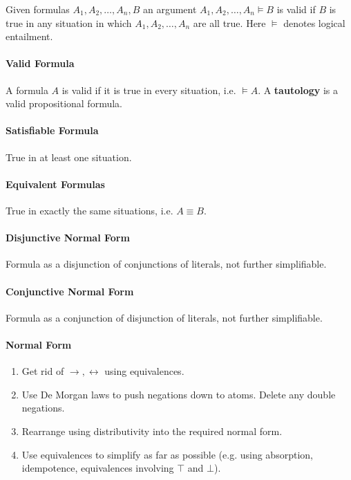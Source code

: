 \documentclass[10pt,twoside,twocolumn]{article}
\begin{document}
Given formulas $A_{1},A_{2},\dots,A_{n},B$ an argument $A_{1},A_{2},\dots,A_{n}\vDash B$
is valid if $B$ is true in any situation in which $A_{1},A_{2},\dots,A_{n}$
are all true. Here $\vDash$ denotes logical entailment.


\paragraph{Valid Formula}

A formula $A$ is valid if it is true in every situation, i.e. $\vDash A$.
A \textbf{tautology} is a valid propositional formula.


\paragraph{Satisfiable Formula}

True in at least one situation.


\paragraph{Equivalent Formulas}

True in exactly the same situations, i.e. $A\equiv B$.


\paragraph{Disjunctive Normal Form}

Formula as a disjunction of conjunctions of literals, not further
simplifiable.


\paragraph{Conjunctive Normal Form}

Formula as a conjunction of disjunction of literals, not further simplifiable.


\paragraph{Normal Form}
\begin{enumerate}
\item Get rid of $\rightarrow,\leftrightarrow$ using equivalences.
\item Use De Morgan laws to push negations down to atoms. Delete any double
negations.
\item Rearrange using distributivity into the required normal form.
\item Use equivalences to simplify as far as possible (e.g. using absorption,
idempotence, equivalences involving $\top$ and $\bot$).
\end{enumerate}
\end{document}
